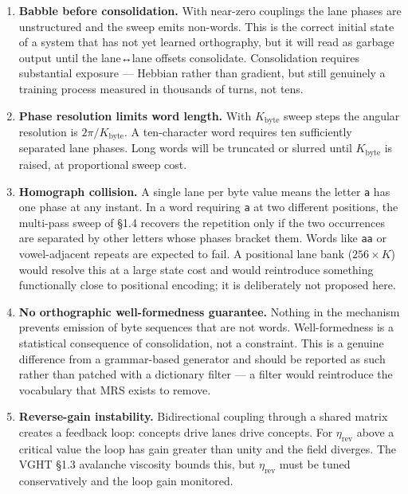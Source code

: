 \documentclass[
  11pt,
  a4paper,
]{article}
\begin{document}
\begin{enumerate}
\def\labelenumi{\arabic{enumi}.}
\item
  \textbf{Babble before consolidation.} With near-zero couplings the
  lane phases are unstructured and the sweep emits non-words. This is
  the correct initial state of a system that has not yet learned
  orthography, but it will read as garbage output until the lane↔lane
  offsets consolidate. Consolidation requires substantial exposure ---
  Hebbian rather than gradient, but still genuinely a training process
  measured in thousands of turns, not tens.
\item
  \textbf{Phase resolution limits word length.} With \(K_{\text{byte}}\)
  sweep steps the angular resolution is \(2\pi/K_{\text{byte}}\). A
  ten-character word requires ten sufficiently separated lane phases.
  Long words will be truncated or slurred until \(K_{\text{byte}}\) is
  raised, at proportional sweep cost.
\item
  \textbf{Homograph collision.} A single lane per byte value means the
  letter \texttt{a} has one phase at any instant. In a word requiring
  \texttt{a} at two different positions, the multi-pass sweep of §1.4
  recovers the repetition only if the two occurrences are separated by
  other letters whose phases bracket them. Words like \texttt{aa} or
  vowel-adjacent repeats are expected to fail. A positional lane bank
  (\(256 \times K\)) would resolve this at a large state cost and would
  reintroduce something functionally close to positional encoding; it is
  deliberately not proposed here.
\item
  \textbf{No orthographic well-formedness guarantee.} Nothing in the
  mechanism prevents emission of byte sequences that are not words.
  Well-formedness is a statistical consequence of consolidation, not a
  constraint. This is a genuine difference from a grammar-based
  generator and should be reported as such rather than patched with a
  dictionary filter --- a filter would reintroduce the vocabulary that
  MRS exists to remove.
\item
  \textbf{Reverse-gain instability.} Bidirectional coupling through a
  shared matrix creates a feedback loop: concepts drive lanes drive
  concepts. For \(\eta_{\text{rev}}\) above a critical value the loop
  has gain greater than unity and the field diverges. The VGHT §1.3
  avalanche viscosity bounds this, but \(\eta_{\text{rev}}\) must be
  tuned conservatively and the loop gain monitored.
\end{enumerate}
\end{document}
